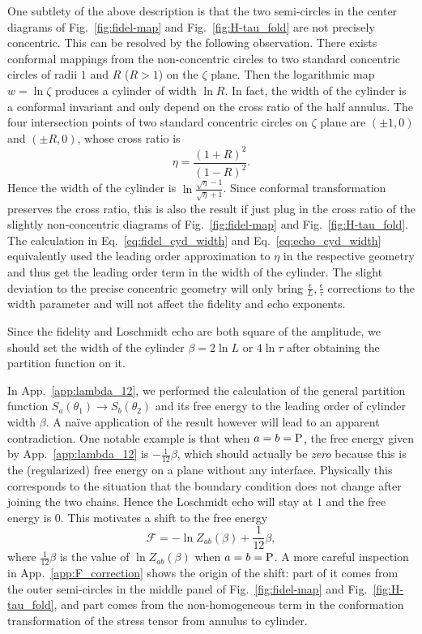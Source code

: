 One subtlety of the above description is that the two semi-circles in the center diagrams of Fig.~\ref{fig:fidel-map} and Fig.~\ref{fig:H-tau_fold} are not precisely concentric. This can be resolved by the following observation. There exists conformal mappings from the non-concentric circles to two standard concentric circles of radii $1$ and $R$ ($R>1$) on the $\zeta$ plane. Then the logarithmic map $w = \ln \zeta$ produces a cylinder of width $\ln R$. In fact, the width of the cylinder is a conformal invariant and only depend on the cross ratio of the half annulus. The four intersection points of two standard concentric circles on $\zeta$ plane are $(\pm 1,0)$ and $(\pm R,0)$, whose cross ratio is
\begin{equation}
\eta = \frac{(1 + R)^2}{(1 - R)^2}. 
\end{equation}
Hence the width of the cylinder is $\ln \frac{\sqrt{ \eta } - 1}{\sqrt{ \eta} + 1}$. Since conformal transformation preserves the cross ratio, this is also the result if just plug in the cross ratio of the slightly non-concentric diagrams of Fig.~\ref{fig:fidel-map} and Fig.~\ref{fig:H-tau_fold}. The calculation in Eq.~\eqref{eq:fidel_cyd_width} and Eq.~\eqref{eq:echo_cyd_width} equivalently used the leading order approximation to $\eta$ in the respective geometry and thus get the leading order term in the width of the cylinder. The slight deviation to the precise concentric geometry will only bring $\frac{\epsilon}{L}, \frac{\epsilon}{\tau}$ corrections to the width parameter and will not affect the fidelity and echo exponents. 

Since the fidelity and Loschmidt echo are both square of the amplitude, we should set the width of the cylinder $\beta = 2 \ln L$ or $ 4 \ln \tau$ after obtaining the partition function on it. 

In App.~\ref{app:lambda_12}, we performed the calculation of the general partition function $S_a( \theta_1 ) \rightarrow S_b( \theta_2)$ and its free energy to the leading order of cylinder width $\beta$. A na\"ive application of the result however will lead to an apparent contradiction. One notable example is that when $a = b  = {\rm P}$, the free energy given by App.~\ref{app:lambda_12} is $- \frac{1}{12}\beta$, which should actually be {\it zero} because this is the (regularized) free energy on a plane without any interface. Physically this corresponds to the situation that the boundary condition does not change after joining the two chains. Hence the Loschmidt echo will stay at $1$ and the free energy is $0$. This motivates a shift to the free energy
\begin{equation}
\mathcal{F} = - \ln Z_{ab} ( \beta ) + \frac{1}{12} \beta ,
\end{equation}
where $\frac{1}{12}\beta$ is the value of $ \ln Z_{ab} ( \beta )$ when $a = b = {\rm P}$. A more careful inspection in App.~\ref{app:F_correction} shows the origin of the shift: part of it comes from the outer semi-circles in the middle panel of Fig.~\ref{fig:fidel-map} and Fig.~\ref{fig:H-tau_fold}, and part comes from the non-homogeneous term in the conformation transformation of the stress tensor from annulus to cylinder. 

